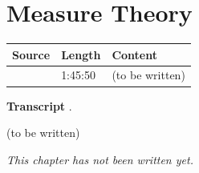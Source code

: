 \chapter{Measure Theory}\label{ch:c25}
\begin{paracol}{2}

\begin{sources}
\begin{tabularx}{\linewidth}{@{}l l L@{}}
\toprule
\textbf{Source} & \textbf{Length} & \textbf{Content}\\
\midrule
{} & 1:45:50 & (to be written)\\
\bottomrule
\end{tabularx}

\smallskip
\textbf{Transcript} .
\end{sources}

\begin{reading}
(to be written)
\end{reading}

\emph{This chapter has not been written yet.}

\flushside
\end{paracol}
